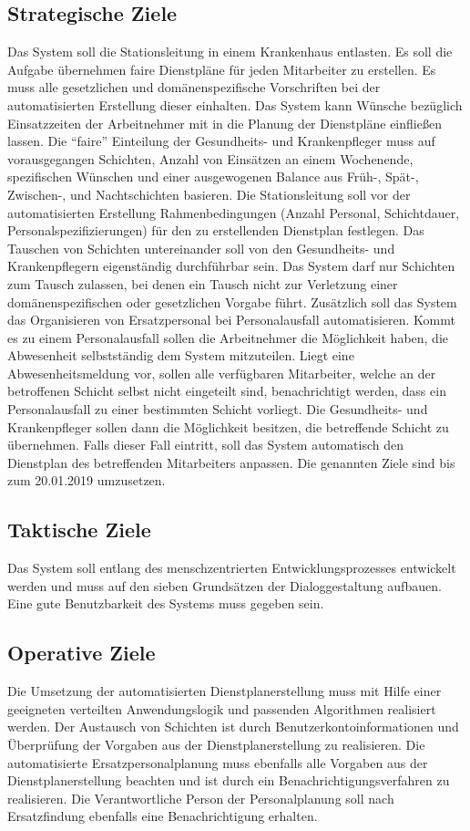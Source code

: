 \documentclass[10pt,a4paper]{article}
\begin{document}
\subsection{Strategische Ziele}
Das System soll die Stationsleitung in einem Krankenhaus entlasten. Es soll die Aufgabe übernehmen faire Dienstpläne für jeden Mitarbeiter zu erstellen. Es muss alle gesetzlichen und domänenspezifische Vorschriften bei der automatisierten Erstellung dieser einhalten. Das System kann Wünsche bezüglich Einsatzzeiten der Arbeitnehmer mit in die Planung der Dienstpläne einfließen lassen. Die “faire” Einteilung der Gesundheits- und Krankenpfleger muss auf vorausgegangen Schichten, Anzahl von Einsätzen an einem Wochenende, spezifischen Wünschen und einer ausgewogenen Balance aus Früh-, Spät-, Zwischen-, und Nachtschichten basieren. Die Stationsleitung soll vor der automatisierten Erstellung Rahmenbedingungen (Anzahl Personal, Schichtdauer, Personalspezifizierungen) für den zu erstellenden Dienstplan festlegen. Das Tauschen von Schichten untereinander soll von den Gesundheits- und Krankenpflegern eigenständig durchführbar sein. Das System darf nur Schichten zum Tausch zulassen, bei denen ein Tausch nicht zur Verletzung einer domänenspezifischen oder gesetzlichen Vorgabe führt. Zusätzlich soll das System das Organisieren von Ersatzpersonal bei Personalausfall automatisieren. Kommt es zu einem Personalausfall sollen die Arbeitnehmer die Möglichkeit haben, die Abwesenheit selbstständig dem System mitzuteilen. Liegt eine Abwesenheitsmeldung vor, sollen alle verfügbaren Mitarbeiter, welche an der betroffenen Schicht selbst nicht eingeteilt sind, benachrichtigt werden, dass ein Personalausfall zu einer bestimmten Schicht vorliegt. Die Gesundheits- und Krankenpfleger sollen dann die Möglichkeit besitzen, die betreffende Schicht zu übernehmen. Falls dieser Fall eintritt, soll das System automatisch den Dienstplan des betreffenden Mitarbeiters anpassen. Die genannten Ziele sind bis zum 20.01.2019 umzusetzen. 
\subsection{Taktische Ziele}
Das System soll entlang des menschzentrierten Entwicklungsprozesses entwickelt werden und muss auf den sieben Grundsätzen der Dialoggestaltung aufbauen. Eine gute Benutzbarkeit des Systems muss gegeben sein. 
\subsection{Operative Ziele}
Die Umsetzung der automatisierten Dienstplanerstellung muss mit Hilfe einer geeigneten verteilten Anwendungslogik und passenden Algorithmen realisiert werden. Der Austausch von Schichten ist durch Benutzerkontoinformationen und Überprüfung der Vorgaben aus der Dienstplanerstellung zu realisieren.  Die automatisierte Ersatzpersonalplanung muss ebenfalls alle Vorgaben aus der Dienstplanerstellung beachten und ist durch ein Benachrichtigungsverfahren zu realisieren. Die Verantwortliche Person der Personalplanung soll nach Ersatzfindung ebenfalls eine Benachrichtigung erhalten.
\end{document}
